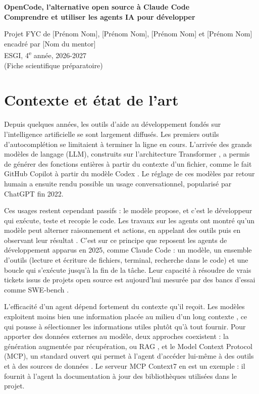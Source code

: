 \documentclass[11pt,a4paper]{article}
\begin{document}
\begin{center}
{\Large\bfseries OpenCode, l'alternative open source à Claude Code\\[2pt]
\large Comprendre et utiliser les agents IA pour développer\par}
\vspace{10pt}
Projet FYC de [Prénom Nom], [Prénom Nom], [Prénom Nom] et [Prénom Nom]\\
encadré par [Nom du mentor]\\
ESGI, 4\textsuperscript{e} année, 2026-2027\\
(Fiche scientifique préparatoire)
\end{center}

\section*{Contexte et état de l'art}

Depuis quelques années, les outils d'aide au développement fondés sur l'intelligence artificielle se sont largement diffusés. Les premiers outils d'autocomplétion se limitaient à terminer la ligne en cours. L'arrivée des grands modèles de langage (LLM), construits sur l'architecture Transformer \citep{vaswani2017}, a permis de générer des fonctions entières à partir du contexte d'un fichier, comme le fait GitHub Copilot à partir du modèle Codex \citep{chen2021}. Le réglage de ces modèles par retour humain \citep{ouyang2022} a ensuite rendu possible un usage conversationnel, popularisé par ChatGPT fin 2022.

Ces usages restent cependant passifs : le modèle propose, et c'est le développeur qui exécute, teste et recopie le code. Les travaux sur les agents ont montré qu'un modèle peut alterner raisonnement et actions, en appelant des outils puis en observant leur résultat \citep{yao2023,schick2023}. C'est sur ce principe que reposent les agents de développement apparus en 2025, comme Claude Code \citep{anthropic2025} : un modèle, un ensemble d'outils (lecture et écriture de fichiers, terminal, recherche dans le code) et une boucle qui s'exécute jusqu'à la fin de la tâche. Leur capacité à résoudre de vrais tickets issus de projets open source est aujourd'hui mesurée par des bancs d'essai comme SWE-bench \citep{jimenez2024}.

L'efficacité d'un agent dépend fortement du contexte qu'il reçoit. Les modèles exploitent moins bien une information placée au milieu d'un long contexte \citep{liu2024}, ce qui pousse à sélectionner les informations utiles plutôt qu'à tout fournir. Pour apporter des données externes au modèle, deux approches coexistent : la génération augmentée par récupération, ou RAG \citep{lewis2020}, et le Model Context Protocol (MCP), un standard ouvert qui permet à l'agent d'accéder lui-même à des outils et à des sources de données \citep{anthropic2024}. Le serveur MCP Context7 \citep{context7} en est un exemple : il fournit à l'agent la documentation à jour des bibliothèques utilisées dans le projet.
\end{document}
